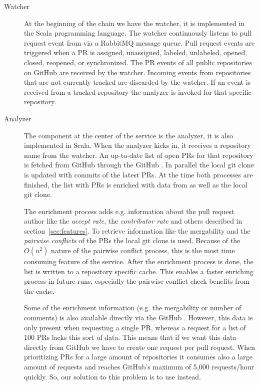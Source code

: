\begin{description}
\item[Watcher]
At the beginning of the chain we have the watcher, it is implemented in the Scala programming language.
The watcher continuously listens to pull request event from \ghtorrent via a RabbitMQ message queue.
Pull request events are triggered when a PR is assigned, unassigned, labeled, unlabeled, opened, closed, reopened, or synchronized.
The PR events of all public repositories on GitHub are received by the watcher.
Incoming events from repositories that are not currently tracked are discarded by the watcher.
If an event is received from a tracked repository the analyzer is invoked for that specific repository.

\item[Analyzer]
The component at the center of the service is the analyzer, it is also implemented in Scala.
When the analyzer kicks in, it receives a repository name from the watcher.
An up-to-date list of open PRs for that repository is fetched from GitHub through the GitHub \api.
In parallel the local git clone is updated with commits of the latest PRs.
At the time both processes are finished, the list with PRs is enriched with data from \ghtorrent as well as the local git clone.

The enrichment process adds e.g. information about the pull request author like the \emph{accept rate}, the \emph{contributor rate} and others described in section~\ref{sec:features}.
To retrieve information like the mergability and the \emph{pairwise conflicts} of the PRs the local git clone is used.
Because of the $O(n^2)$ nature of the pairwise conflict process, this is the most time consuming feature of the service.
After the enrichment process is done, the list is written to a repository specific cache.
This enables a faster enriching process in future runs, especially the pairwise conflict check benefits from the cache.

Some of the enrichment information (e.g. the mergability or number of comments) is also available directly via the GitHub \api.
However, this data is only present when requesting a single PR, whereas a request for a list of 100 PRs lacks this sort of data.
This means that if we want this data directly from GitHub we have to create one \api request per pull request.
When prioritizing PRs for a large amount of repositories it consumes also a large amount of \api requests and reaches GitHub's maximum of 5,000 requests/hour quickly.
So, our solution to this problem is to use \ghtorrent instead.


\end{description}
